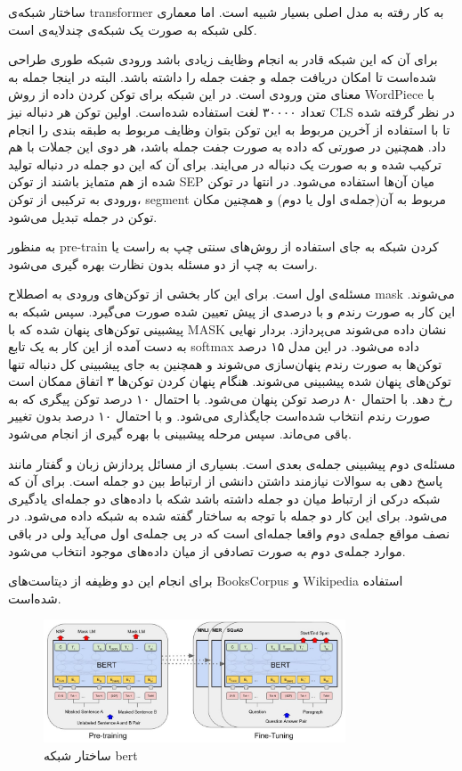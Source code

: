 \documentclass[12pt, a4paper, oneside]{report}
\begin{document}
ساختار شبکه‌ی
transformer
به کار رفته به مدل اصلی بسیار شبیه است. اما معماری کلی شبکه به صورت یک شبکه‌ی چندلایه‌ی
است. 

برای آن که این شبکه قادر به انجام وظایف زیادی باشد ورودی شبکه طوری طراحی شده‌است تا امکان دریافت جمله و جفت جمله
را داشته باشد. البته در اینجا جمله به معنای متن ورودی است.
در این شبکه برای توکن کردن داده از روش
WordPiece
با تعداد ۳۰۰۰۰ لغت استفاده شده‌است. اولین توکن هر دنباله نیز
CLS
در نظر گرفته شده تا با استفاده از آخرین
مربوط به این توکن بتوان وظایف مربوط به طبقه بندی را انجام داد.
همچنین در صورتی که داده به صورت جفت جمله باشد، هر دوی این جملات با هم ترکیب شده و به صورت یک دنباله در می‌ایند.
برای آن که این دو جمله در دنباله تولید شده از هم متمایز باشند از توکن
SEP
میان آن‌ها استفاده می‌شود. در انتها در توکن ورودی به ترکیبی از توکن،
segment
مربوط به آن(جمله‌ی اول یا دوم)
و همچنین مکان توکن در جمله تبدیل می‌شود.

به منظور
pre-train
کردن شبکه‌ به جای استفاده از روش‌های سنتی چپ به راست یا راست به چپ از دو مسئله بدون نظارت بهره گیری می‌شود.

مسئله‌ی اول
است. برای این کار بخشی از توکن‌های ورودی به اصطلاح
mask
می‌شوند. این کار به صورت رندم و با درصدی از پیش تعیین شده صورت می‌گیرد. سپس شبکه به پیشبینی توکن‌های پنهان شده
که با 
MASK
نشان داده می‌شوند می‌پردازد. بردار نهایی به دست آمده از این کار به یک تابع
softmax
داده می‌شود. در این مدل ۱۵ درصد توکن‌ها به صورت رندم پنهان‌سازی می‌شوند و همچنین به جای پیشبینی کل دنباله تنها
توکن‌های پنهان شده پیشبینی می‌شوند. هنگام پنهان کردن توکن‌ها ۳ اتفاق ممکان است رخ دهد. با احتمال ۸۰ درصد توکن
پنهان می‌شود. با احتمال ۱۰ درصد توکن پیگری که به صورت رندم انتخاب شده‌است جایگذاری می‌شود. و با احتمال ۱۰ درصد
بدون تغییر باقی می‌ماند. سپس مرحله پیشبینی با بهره گیری از
انجام می‌شود.

مسئله‌ی دوم پیشبینی جمله‌ی بعدی است. بسیاری از مسائل پردازش زبان و گفتار مانند پاسخ دهی به سوالات نیازمند داشتن
دانشی از ارتباط بین دو جمله است. برای آن که شبکه درکی از ارتباط میان دو جمله داشته باشد شکه با داده‌های دو جمله‌ای
یادگیری می‌شود. برای این کار دو جمله با توجه به ساختار گفته شده به شبکه داده می‌شود. در نصف مواقع جمله‌ی دوم
واقعا جمله‌ای است که در پی جمله‌ی اول می‌آید ولی در باقی موارد جمله‌ی دوم به صورت تصادفی از میان داده‌های موجود
انتخاب می‌شود.

برای انجام این دو وظیفه از دیتاست‌های
BooksCorpus
و
Wikipedia
استفاده شده‌است. 

\begin{figure}[h]
    \centering
    \includegraphics[width=0.8\textwidth]{bert}
    \caption{ ساختار شبکه bert }
    \label{fig:bert}
\end{figure}
\end{document}
